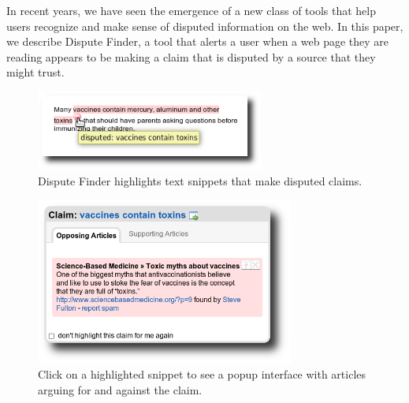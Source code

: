 \documentclass{www2010-accepted}
\newcommand{\todo}[1]{}
\begin{document}
In recent years, we have seen the emergence of a new class of tools that help users recognize and make sense of disputed information on the web. In this paper, we describe Dispute Finder, a tool that alerts a user when a web page they are reading appears to be making a claim that is disputed by a source that they might trust.

\begin{figure}[tb]
	\begin{center}
	\includegraphics[width=7.5cm]{pictures/highlight_vaccine_shadow.png}
	\caption{Dispute Finder highlights text snippets that make disputed claims.}
	\label{highlight}
	\end{center}
\end{figure}

\begin{figure}[tb]
	\begin{center}
	\includegraphics[width=8.5cm]{pictures/popup_vaccine_shadow_big2.png}
	\caption{Click on a highlighted snippet to see a popup interface with articles arguing for and against the claim.}
	\label{claimview}
	\end{center}
\end{figure}
\todo{Popup interface should contain a ``don't mark this'' button}

\todo{More screenshots/graphs/visual information}

\todo{word this better}\todo{update all screenshots}

\end{document}
